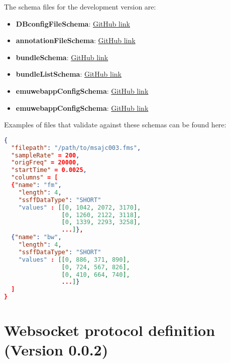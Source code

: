 \documentclass[A4,12pt, utf8]{article}
\begin{document}
The schema files for the development version are:

\begin{itemize}
  \item \textbf{DBconfigFileSchema}: \href{https://github.com/IPS-LMU/EMU-webApp/blob/master/dist/schemaFiles/DBconfigFileSchema.json}{GitHub link}
  \item \textbf{annotationFileSchema}: \href{https://github.com/IPS-LMU/EMU-webApp/blob/master/dist/schemaFiles/annotationFileSchema.json}{GitHub link}
  \item \textbf{bundleSchema}: \href{https://github.com/IPS-LMU/EMU-webApp/blob/master/dist/schemaFiles/bundleSchema.json}{GitHub link}
  \item \textbf{bundleListSchema}: \href{https://github.com/IPS-LMU/EMU-webApp/blob/master/dist/schemaFiles/bundleListSchema.json}{GitHub link}
  \item \textbf{emuwebappConfigSchema}: \href{https://github.com/IPS-LMU/EMU-webApp/blob/master/dist/schemaFiles/emuwebappConfigSchema.json}{GitHub link}
  \item \textbf{emuwebappConfigSchema}: \href{https://github.com/IPS-LMU/EMU-webApp/blob/master/dist/schemaFiles/emuwebappConfigSchema.json}{GitHub link}
\end{itemize}


Examples of files that validate against these schemas can be found here: 



\begin{lstlisting}[caption=EMU-webApp internal derived signal representation, label=idsr, language=json,firstnumber=1]
{
  "filepath": "/path/to/msajc003.fms",
  "sampleRate" = 200,
  "origFreq" = 20000,
  "startTime" = 0.0025,
  "columns" = [
  {"name": "fm",
    "length": 4,
    "ssffDataType": "SHORT"
    "values" : [[0, 1042, 2072, 3170],
                [0, 1260, 2122, 3118],
                [0, 1339, 2293, 3258],
                ...]},
  {"name": "bw",
    "length": 4,
    "ssffDataType": "SHORT"
    "values" : [[0, 886, 371, 890],
                [0, 724, 567, 826],
                [0, 410, 664, 740],
                ...]}
  ]
}
\end{lstlisting}

\clearpage

\section{Websocket protocol definition (Version 0.0.2)}
\end{document}

